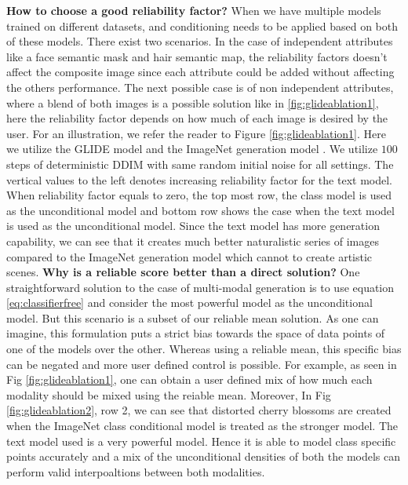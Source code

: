 \documentclass[10pt,twocolumn,letterpaper]{article}
\begin{document}
\noindent\textbf{How to choose a good reliability factor?}
 When we have multiple models trained on different datasets, and conditioning needs to be applied based on both of these models. There exist two scenarios. In the case of independent attributes like a face semantic mask  and hair semantic map, the reliability factors doesn't affect the composite image since each attribute could be added without affecting the others performance. The next possible case is of non independent attributes, where a blend of both images is a possible solution like in \ref{fig:glideablation1}, here the reliability factor depends on how much of each image is desired by the user. For an illustration, we refer the reader to Figure \ref{fig:glideablation1}. Here we utilize the GLIDE model and the ImageNet generation model \cite{dhariwal2021diffusion}. We utilize $100$ steps of deterministic DDIM \cite{song2020denoising} with same random initial noise for all settings.  The vertical values to the left denotes increasing reliability factor for the text model. When reliability factor equals to zero, the top most row, the class model is used as the unconditional model and bottom row shows the case when the text model is used as the unconditional model. Since the text model has more generation capability, we can see that it creates much better naturalistic series of images compared to the ImageNet generation model \cite{dhariwal2021diffusion} which cannot to create artistic scenes.
 \newline
 \noindent\textbf{Why is a reliable score better than a direct solution?} One straightforward solution to the case of multi-modal generation is to use equation \eqref{eq:classifierfree} and  consider the most powerful model as the unconditional model. But this scenario is  a subset of our reliable mean solution. As one can imagine, this formulation puts a strict bias towards the space of data points of one of the models over the other. 
 Whereas using a reliable mean, this specific bias can be negated  and more user defined control is possible. For example, as seen in Fig \ref{fig:glideablation1}, one can obtain a user defined mix of how much each modality should be mixed using the reiable mean. Moreover, In Fig  \ref{fig:glideablation2},
 row 2, we can see that distorted cherry blossoms are created when the ImageNet class conditional model is treated as the stronger model. The text model used is a very powerful model\cite{nichol2021glide}. Hence it is able to model class specific points accurately and a mix of the unconditional densities of both the models can perform valid interpoaltions between both modalities.
 
\end{document}
